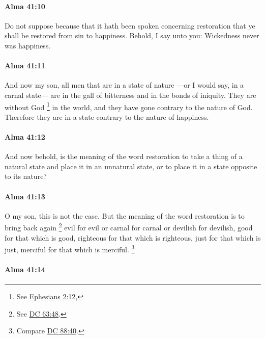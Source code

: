		\paragraph{Alma 41:10} %
			\label{ALMA-41-10}

			Do not suppose because that it hath been spoken concerning restoration
			that ye shall be restored from sin to happiness.
			Behold, I say unto you:
			Wickedness never was happiness.

		\paragraph{Alma 41:11} %
			\label{ALMA-41-11}

			And now my son, all men that are in a state of nature
			---or I would say, in a carnal state---
			are in the gall of bitterness and in the bonds of iniquity.
			They are without God%
				\footnote{%
					See \hyperref[EPHESIANS-2-12]{Ephesians 2:12}, 
					}
			in the world,
			and they have gone contrary to the nature of God.
			Therefore they are in a state contrary to the nature of happiness.

		\paragraph{Alma 41:12} %
			\label{ALMA-41-12}

			And now behold, is the meaning of the word restoration
			to take a thing of a natural state and place it in an unnatural state,
			or to place it in a state opposite to its nature?

		\paragraph{Alma 41:13} %
			\label{ALMA-41-13}

			O my son, this is not the case.
			But the meaning of the word restoration is to bring back again%
				\footnote{%
					See \hyperref[DC63-48]{DC 63:48}.
					}
			evil for evil
			or carnal for carnal or devilish for devilish,
			good for that which is good,
			righteous for that which is righteous,
			just for that which is just,
			merciful for that which is merciful.%
				\footnote{%
					Compare \hyperref[DC88-40]{DC 88:40}.
					}

		\paragraph{Alma 41:14} %
			\label{ALMA-41-14}

